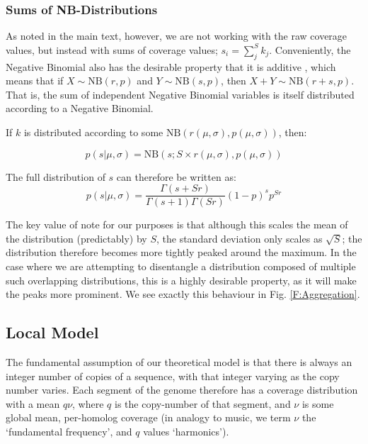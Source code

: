 \documentclass[fleqn,usenatbib]{mnras}
\begin{document}
{{				\subsubsection{Sums of NB-Distributions}\label{A:Sums}
					As noted in the main text, however, we are not working with the raw coverage values, but instead with sums of coverage values; $s_i = \sum_j^S k_j$. Conveniently, the Negative Binomial also has the desirable property that it is additive \citep{RHBMaths}, which means that if $X \sim \text{NB}(r,p)$ and $Y \sim \text{NB}(s,p)$, then $X + Y \sim \text{NB}(r + s,p)$. That is, the sum of independent Negative Binomial variables is itself distributed according to a Negative Binomial. 

					If $k$ is distributed according to some $\text{NB}(r(\mu,\sigma), p(\mu,\sigma))$, then:
					
					\begin{equation}
						p(s | \mu, \sigma) = 	\text{NB}\left(s; S \times r(\mu,\sigma), p(\mu,\sigma)\right)
					\end{equation}

					The full distribution of $s$ can therefore be written as:
					\begin{equation}
						p(s| \mu,\sigma) = \frac{\Gamma(s + Sr)}{\Gamma(s+1) \Gamma(Sr)} (1 - p)^s p^{Sr}
					\end{equation}

					The key value of note for our purposes is that although this scales the mean of the distribution (predictably) by $S$, the standard deviation only scales as $\sqrt{S}$; the distribution therefore becomes more tightly peaked around the maximum. In the case where we are attempting to disentangle a distribution composed of multiple such overlapping distributions, this is a highly desirable property, as it will make the peaks more prominent. We see exactly this behaviour in Fig. \ref{F:Aggregation}.


				\subsection{Local Model}\label{A:Model}
					
					The fundamental assumption of our theoretical model is that there is always an integer number of copies of a sequence, with that integer varying as the copy number varies. Each segment of the genome therefore has a coverage distribution with a mean $q \nu$, where $q$ is the copy-number of that segment, and $\nu$ is some global mean, per-homolog coverage (in analogy to music, we term $\nu$ the `fundamental frequency', and $q$ values `harmonics').
					
}}
\end{document}
